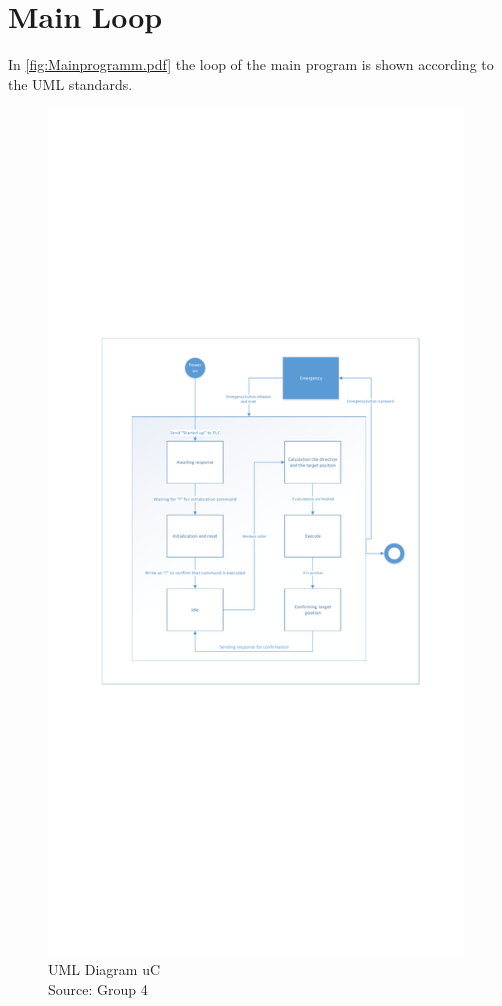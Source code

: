 \documentclass[a4paper,12pt]{scrreprt}
\begin{document}
\section{Main Loop}


In \autoref{fig:Mainprogramm.pdf} the loop of the main program is shown according to the \acs{UML} standards.
\begin{figure}[H]
  \centering
   \includegraphics[width=0.98\textwidth]{pictures/Mainprogramm.pdf}
   \caption[UML Diagram \acs{uC}]{UML Diagram \acs{uC}\\
	Source: Group 4  
   }
   \label{fig:Mainprogramm.pdf}
\end{figure} 
\end{document}

